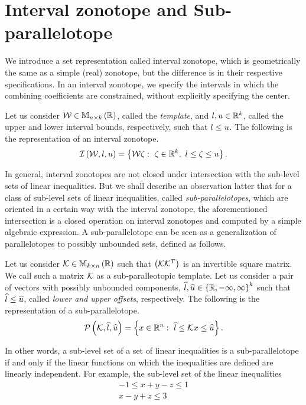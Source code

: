 \section{Interval zonotope and Sub-parallelotope}
We introduce a set representation called interval zonotope, which is
geometrically the same as a simple (real) zonotope, but the difference
is in their respective specifications.  In an interval zonotope, we
specify the intervals in which the combining coefficients are
constrained, without explicitly specifying the center.
%
\begin{definition}
Let us consider $\mathcal{W}\in\mathbb{M}_{n\times k}\left(\mathbb{R}\right)$, called the {\it
  template}, and $l,u\in\mathbb{R}^k$, called the upper and lower
interval bounds, respectively, such that $l\leq u$.  The following
is the representation of an interval zonotope.
%
\[
\mathit{\operatorname{\mathcal{I}}}\left(\mathcal{W},l,u\right)=\left\{\mathcal{W}\zeta:~\zeta\in\mathbb{R}^k,~l\leq\zeta\leq u\right\}.
\]
%
\end{definition}
%
In general, interval zonotopes are not closed under intersection with
the sub-level sets of linear inequalities. But we shall describe an
observation latter that for a class of sub-level sets of linear
inequalities, called \emph{sub-parallelotopes}, which are oriented in
a certain way with the interval zonotope, the aforementioned
intersection is a closed operation on interval zonotopes and computed
by a simple algebraic expression. A sub-parallelotope can be seen as a
generalization of parallelotopes to possibly unbounded sets, defined
as follows.
%
\begin{definition}
Let us consider ${\mathcal{K}}\in\mathbb{M}_{k\times n}\left(\mathbb{R}\right)$ such that
$\left(\mathcal{K}{\mathcal{K}}^T\right)$ is an invertible square matrix.  We
call such a matrix $\mathcal{K}$ as a sub-paralleotopic template.  Let us
consider a pair of vectors with possibly unbounded components,
$\widehat{l},\widehat{u}\in\left\{\mathbb{R},-\infty,\infty\right\}^k$ such that $\widehat{l}\leq\widehat{u}$,
called {\it lower and upper offsets}, respectively.  The following is
the representation of a sub-parallelotope.
%
\[
\mathcal{P}\left(\mathcal{K},\widehat{l},\widehat{u}\right)=\left\{x\in\mathbb{R}^n:~\widehat{l}\leq\mathcal{K} x\leq\widehat{u}\right\}.
\]
%
\end{definition}
%
In other words, a sub-level set of a set of linear inequalities is a
sub-parallelotope if and only if the linear functions on which the
inequalities are defined are linearly independent. For example, the
sub-level set of the linear inequalities
%
\begin{align*}
-1\leq x+y-z\leq 1\\
x-y+z\leq 3
\end{align*}
